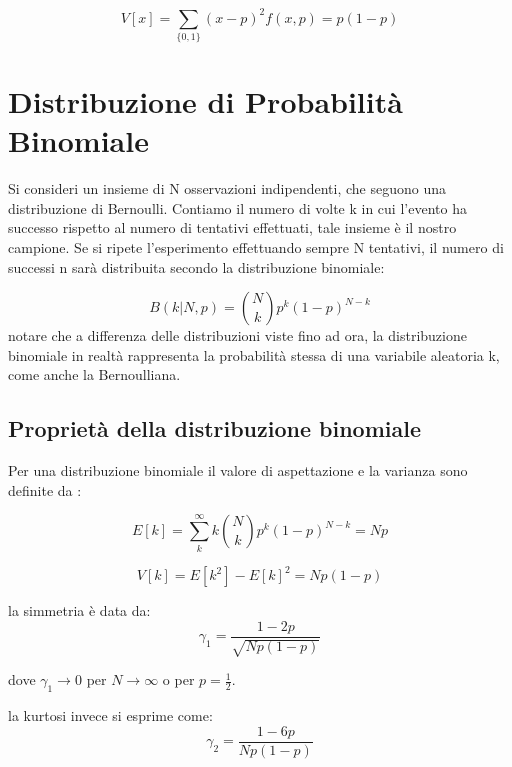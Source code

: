 \begin{equation}
	V[x] = \sum_{\{0,1\}}(x-p)^2f(x,p) = p(1-p)
\end{equation}

\section{Distribuzione di Probabilit\`{a} Binomiale}

Si consideri un insieme di N osservazioni indipendenti, che seguono una distribuzione di Bernoulli. Contiamo il numero di volte k in cui l'evento ha successo rispetto al numero di tentativi effettuati, tale insieme \`{e} il nostro campione. Se si ripete l'esperimento effettuando sempre N tentativi, il numero di successi n sar\`{a} distribuita secondo la distribuzione binomiale:

\begin{equation*}
	B(k \vert N,p) = \binom{N}{k}p^k(1-p)^{N-k}
\end{equation*} 
\newline
notare che a differenza delle distribuzioni viste fino ad ora, la distribuzione binomiale in realt\`{a} rappresenta la probabilit\`{a} stessa di una variabile aleatoria k, come anche la Bernoulliana.

\subsection{Propriet\`{a} della distribuzione binomiale}

Per una distribuzione binomiale il valore di aspettazione e la varianza sono definite da :

\begin{equation}
	E[k] = \sum_{k}^\infty k \binom{N}{k}p^k(1-p)^{N-k} = Np
\end{equation}

\begin{equation}
	V[k] = E[k^2] - E[k]^2 = Np(1-p)
\end{equation}

\noindent la simmetria \`{e} data da:
\begin{equation}
	\gamma_1 = \dfrac{1-2p}{\sqrt{Np(1-p)}}
\end{equation}

dove $\gamma_1 \rightarrow 0 $ per $N \rightarrow \infty $ o per $p = \frac{1}{2}$.\newline

la kurtosi invece si esprime come:
\begin{equation}
	\gamma_2 = \dfrac{1-6p}{Np(1-p)}
\end{equation}

